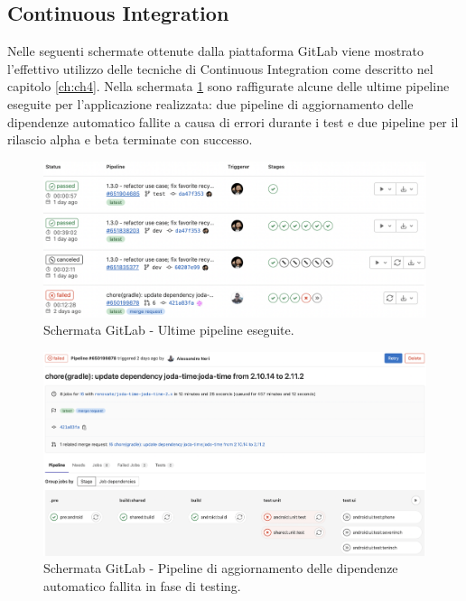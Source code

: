 \subsection{Continuous Integration}
Nelle seguenti schermate ottenute dalla piattaforma GitLab viene mostrato l'effettivo utilizzo delle tecniche di Continuous Integration come descritto nel capitolo \ref{ch:ch4}. Nella schermata \ref{pipelinesapp} sono raffigurate alcune delle ultime pipeline eseguite per l'applicazione realizzata: due pipeline di aggiornamento delle dipendenze automatico fallite a causa di errori durante i test e due pipeline per il rilascio alpha e beta terminate con successo.

\begin{figure}[H]
\centering
    \includegraphics[width=1\textwidth]{img/Screenshot 2022-09-28 at 15.58.43.png}
    \caption{Schermata GitLab - Ultime pipeline eseguite.}
    \label{pipelinesapp}
\end{figure}

\begin{figure}[H]
\centering
    \includegraphics[width=1\textwidth]{img/Screenshot 2022-09-28 at 15.54.26.png}
    \caption{Schermata GitLab - Pipeline di aggiornamento delle dipendenze automatico fallita in fase di testing.}
    \label{mergerequestrenova}
\end{figure}


